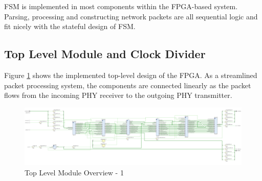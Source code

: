 \documentclass[a4paper]{report}
\begin{document}
FSM is implemented in most components within the FPGA-based system. Parsing, processing and constructing network packets are all sequential logic and fit nicely with the stateful design of FSM.

\subsection{Top Level Module and Clock Divider}
\label{section:implementation-hardware-implementation-top-level-clock-divdier}

Figure \ref{fig:top-level-design} shows the implemented top-level design of the FPGA. As a streamlined packet processing system, the components are connected linearly as the packet flows from the incoming PHY receiver to the outgoing PHY transmitter.

\begin{landscape}
\begin{figure}[h!]
  \centering
  \includegraphics*[viewport={0 0 950 600}, height=\textwidth, width=2\textheight, keepaspectratio]{imgs/top-level-module.png}
  \caption{Top Level Module Overview - 1}
  \label{fig:top-level-design}
\end{figure}
\begin{figure}[h!]
  \ContinuedFloat
  \centering

\end{figure}
\end{landscape}
\end{document}
